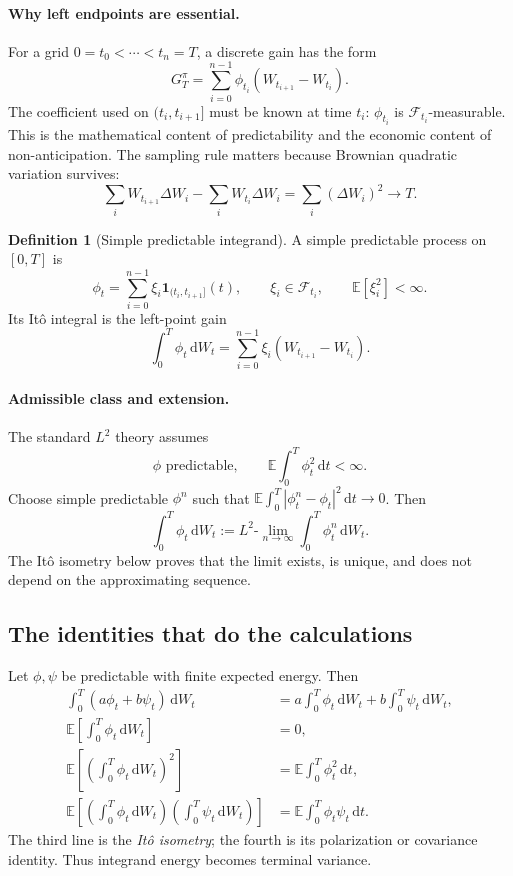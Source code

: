 \documentclass[11pt]{article}
\newcommand{\F}{\mathcal{F}}
\newcommand{\E}{\mathbb{E}}
\newcommand{\dd}{\,\mathrm{d}}
\newcommand{\1}{\mathbf{1}}
\theoremstyle{plain}
\theoremstyle{definition}
\newtheorem{definition}[theorem]{Definition}
\theoremstyle{remark}
\begin{document}
\paragraph{Why left endpoints are essential.}
For a grid \(0=t_0<\cdots<t_n=T\), a discrete gain has the form
\[
G_T^\pi=\sum_{i=0}^{n-1}\phi_{t_i}
        (W_{t_{i+1}}-W_{t_i}).
\]
The coefficient used on \((t_i,t_{i+1}]\) must be known at time \(t_i\):
\(\phi_{t_i}\) is \(\F_{t_i}\)-measurable. This is the mathematical content
of predictability and the economic content of non-anticipation. The sampling
rule matters because Brownian quadratic variation survives:
\[
\sum_i W_{t_{i+1}}\Delta W_i-
\sum_i W_{t_i}\Delta W_i
=\sum_i(\Delta W_i)^2\longrightarrow T.
\]

\begin{definition}[Simple predictable integrand]
A simple predictable process on \([0,T]\) is
\[
\phi_t=\sum_{i=0}^{n-1}\xi_i\1_{(t_i,t_{i+1}]}(t),
\qquad \xi_i\in\F_{t_i},\qquad \E[\xi_i^2]<\infty.
\]
Its It\^o integral is the left-point gain
\[
\boxed{
\int_0^T\phi_t\dd W_t
=\sum_{i=0}^{n-1}\xi_i(W_{t_{i+1}}-W_{t_i}).}
\]
\end{definition}

\paragraph{Admissible class and extension.}
The standard \(L^2\) theory assumes
\[
\phi\text{ predictable},
\qquad
\boxed{\E\int_0^T\phi_t^2\dd t<\infty.}
\]
Choose simple predictable \(\phi^n\) such that
\(\E\int_0^T|\phi_t^n-\phi_t|^2\dd t\to0\). Then
\[
\boxed{
\int_0^T\phi_t\dd W_t
:=L^2\text{-}\lim_{n\to\infty}
\int_0^T\phi_t^n\dd W_t.}
\]
The It\^o isometry below proves that the limit exists, is unique, and does
not depend on the approximating sequence.

\subsection{The identities that do the calculations}

Let \(\phi,\psi\) be predictable with finite expected energy. Then
\begin{align*}
\int_0^T(a\phi_t+b\psi_t)\dd W_t
&=a\int_0^T\phi_t\dd W_t+b\int_0^T\psi_t\dd W_t,\\
\E\left[\int_0^T\phi_t\dd W_t\right]&=0,\\
\E\left[\left(\int_0^T\phi_t\dd W_t\right)^2\right]
&=\E\int_0^T\phi_t^2\dd t,\\
\E\left[\left(\int_0^T\phi_t\dd W_t\right)
           \left(\int_0^T\psi_t\dd W_t\right)\right]
&=\E\int_0^T\phi_t\psi_t\dd t.
\end{align*}
The third line is the \emph{It\^o isometry}; the fourth is its polarization
or covariance identity. Thus integrand energy becomes terminal variance.
\end{document}
